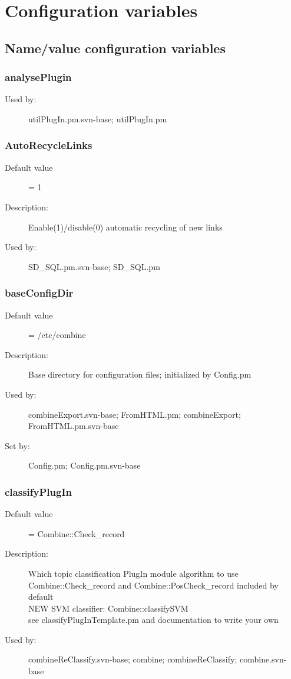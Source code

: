 
\section{Configuration variables}
\label{configvars}
\subsection{Name/value configuration variables}
\subsubsection{analysePlugin}
\label{analysePlugin}
\begin{description}
\item[Used by:] utilPlugIn.pm.svn-base; utilPlugIn.pm
\end{description}
\subsubsection{AutoRecycleLinks}
\label{AutoRecycleLinks}
\begin{description}
\item[Default value] = 1
\item[Description:] Enable(1)/disable(0) automatic recycling of new links
\item[Used by:] SD\_SQL.pm.svn-base; SD\_SQL.pm
\end{description}
\subsubsection{baseConfigDir}
\label{baseConfigDir}
\begin{description}
\item[Default value] = /etc/combine
\item[Description:] Base directory for configuration files; initialized by Config.pm
\item[Used by:] combineExport.svn-base; FromHTML.pm; combineExport; FromHTML.pm.svn-base
\item[Set by:] Config.pm; Config.pm.svn-base
\end{description}
\subsubsection{classifyPlugIn}
\label{classifyPlugIn}
\begin{description}
\item[Default value] = Combine::Check\_record
\item[Description:] Which topic classification PlugIn module algorithm to use \\ Combine::Check\_record and Combine::PosCheck\_record included by default \\ NEW SVM classifier: Combine::classifySVM \\ see classifyPlugInTemplate.pm and documentation to write your own
\item[Used by:] combineReClassify.svn-base; combine; combineReClassify; combine.svn-base
\end{description}

